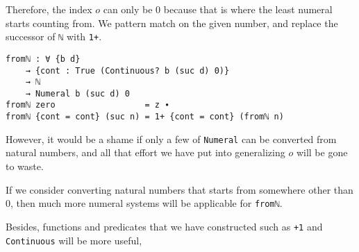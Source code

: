 \documentclass[\main/thesis.tex]{subfiles}
\begin{document}
Therefore, the index $o$ can only be $0$ because that is where the least
numeral starts counting from.
We pattern match on the given number, and replace the successor of \lstinline|ℕ|
with \lstinline|1+|.

\begin{lstlisting}
fromℕ : ∀ {b d}
    → {cont : True (Continuous? b (suc d) 0)}
    → ℕ
    → Numeral b (suc d) 0
fromℕ zero                  = z ∙
fromℕ {cont = cont} (suc n) = 1+ {cont = cont} (fromℕ n)
\end{lstlisting}

However, it would be a shame if only a few of \lstinline|Numeral| can be
converted from natural numbers, and all that effort we have put into
generalizing $ o $ will be gone to waste.

If we consider converting natural numbers that starts from somewhere other than
$0$, then much more numeral systems will be applicable for \lstinline|fromℕ|.

\begin{center}
    \begin{adjustbox}{max width=\textwidth}
    \end{adjustbox}
\end{center}

Besides, functions and predicates that we have constructed such as \lstinline|+1|
and \lstinline|Continuous| will be more useful, 



\end{document}
